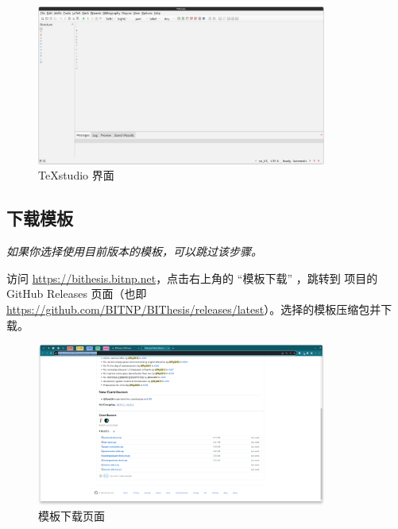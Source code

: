 \begin{figure}[H]
  \begin{center}
    \includegraphics[width=0.85\textwidth]{imgs/texstudio-overview.png}
  \end{center}
  \caption{TeXstudio 界面}
  \label{fig:texstudio-overview}
\end{figure}

\subsection{下载模板}

\textit{如果你选择使用目前版本的模板，可以跳过该步骤。}

访问 \url{https://bithesis.bitnp.net}，点击右上角的 ``模板下载'' ，跳转到 \BIThesis 项目的 GitHub Releases 页面（也即 \url{https://github.com/BITNP/BIThesis/releases/latest}）。选择的模板压缩包并下载。


\begin{figure}[H]
  \begin{center}
    \includegraphics[width=0.85\textwidth]{imgs/github-releases.png}
  \end{center}
  \caption{模板下载页面}
  \label{fig:local-template-download}
\end{figure}

